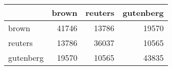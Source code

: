 \begin{tabular}{lrrr}
\hline
           &   brown &   reuters &   gutenberg \\
\hline
 brown     &   41746 &     13786 &       19570 \\
 reuters   &   13786 &     36037 &       10565 \\
 gutenberg &   19570 &     10565 &       43835 \\
\hline
\end{tabular}